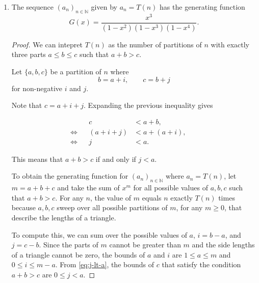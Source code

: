 \begin{enumerate}
\begin{enumerate}
                Since $T(n) = \abs{L_n}$, the sequence of $T(n)$ for $1 \le n \le 10$ is
                \[ \left(T(n)\right)_{n \le 10} = \{0, 0, 1, 1, 1, 1, 2, 1, 3, 2\}. \]

                \bigskip

            \item
                \begin{proposition} \label{prop:2-b}
                    The sequence $(a_n)_{n \in \mathbb{N}}$ given by $a_n = T(n)$ has the generating function
                    \[ G(x) = \frac{x^3}{(1 - x^2) (1 - x^3) (1 - x^4)}. \]
                \end{proposition}

                \medskip

                \begin{proof}
                    We can intepret $T(n)$ as the number of partitions of $n$ with exactly three parts $a \le b \le c$ such that $a + b > c$.

                    Let $\{a, b, c\}$ be a partition of $n$ where
                    \[ b = a + i, \qquad c = b + j \]
                    for non-negative $i$ and $j$.

                    Note that $c = a + i + j$.
                    Expanding the previous inequality gives
                    \begin{spreadlines}{\baselineskip}
                        \begin{align}
                            && c &< a + b, \nonumber && \\
                            \Longleftrightarrow && (a + i + j) &< a + (a + i), \nonumber \\
                            \Longleftrightarrow && j &< a. \label{eq:j-lt-a}
                        \end{align}
                    \end{spreadlines}
                    This means that $a + b > c$ if and only if $j < a$.

                    To obtain the generating function for $(a_n)_{n \in \mathbb{N}}$ where $a_n = T(n)$, let $m = a + b + c$ and take the sum of $x^m$ for all possible values of $a, b, c$ such that $a + b > c$.
                    For any $n$, the value of $m$ equals $n$ exactly $T(n)$ times because $a, b, c$ sweep over all possible partitions of $m$, for any $m \ge 0$, that describe the lengths of a triangle.

                    To compute this, we can sum over the possible values of $a$, $i = b - a$, and $j = c - b$.
                    Since the parts of $m$ cannot be greater than $m$ and the side lengths of a triangle cannot be zero, the bounds of $a$ and $i$ are $1 \le a \le m$ and $0 \le i \le m - a$.
                    From \cref{eq:j-lt-a}, the bounds of $c$ that satisfy the condition $a + b > c$ are $0 \le j < a$.


\end{proof}
\end{enumerate}
\end{enumerate}
